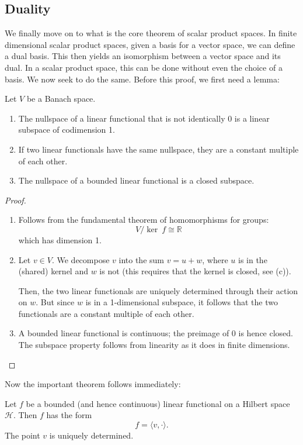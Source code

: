 \documentclass[twoside,symmetric, openany, 12pt]{./tuftebook}
\theoremstyle{definition}
\theoremstyle{definition}
\theoremstyle{definition}
\newenvironment{parts}{\begin{enumerate}[label=(\alph*)]}{\end{enumerate}}
\newcommand{\R}{\mathbb{R}}
\begin{document}
\subsection{Duality}
We finally move on to what is the core theorem of scalar product spaces. In finite dimensional scalar product spaces, given a basis for a vector space, we can define a dual basis. This then yields an isomorphism between a vector space and its dual. In a scalar product space, this can be done without even the choice of a basis. We now seek to do the same. Before this proof, we first need a lemma:
\begin{Lemma}
	Let $V$ be a Banach space.
	\begin{parts}
	\item The nullspace of a linear functional that is not identically 0 is a linear subspace of codimension 1.
	\item If two linear functionals have the same nullspace, they are a constant multiple of each other.
	\item The nullspace of a bounded linear functional is a closed subspace.
	\end{parts}
\end{Lemma}
\begin{proof}
	\begin{parts}
	\item Follows from the fundamental theorem of homomorphisms for groups:
		\[
		V / \ker~f \cong \R
		\]
		which has dimension 1.
	\item Let $v\in V$. We decompose $v$ into the sum $v = u + w$, where $u$ is in the (shared) kernel and $w$ is not (this requires that the kernel is closed, see (c)). 

		Then, the two linear functionals are uniquely determined through their action on $w$. But since $w$ is in a 1-dimensional subspace, it follows that the two functionals are a constant multiple of each other.
	\item A bounded linear functional is continuous; the preimage of $0$ is hence closed. The subspace property follows from linearity as it does in finite dimensions.\qedhere
	\end{parts}
\end{proof}
Now the important theorem follows immediately:
\begin{Theorem}
	Let $f$ be a bounded (and hence continuous) linear functional on a Hilbert space $\mathcal{H}$. Then $f$ has the form
	\[
	f = \langle v, \cdot\rangle
	.\] 
	The point $v$ is uniquely determined.
\end{Theorem}
\end{document}
